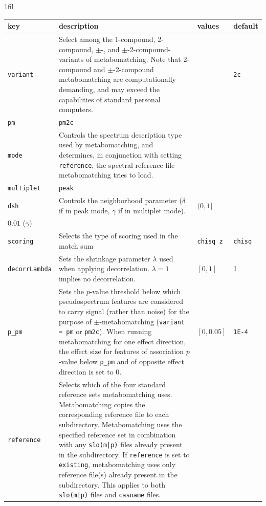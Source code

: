 \documentclass[a4paper,11pt]{article}
\makeatletter
\newcommand*{\centerfloat}{%
  \parindent \z@
  \leftskip \z@ \@plus 1fil \@minus \textwidth
  \rightskip\leftskip
  \parfillskip \z@skip}
\makeatother
\begin{document}
\begin{table}[h]
\small
\centerfloat
\begin{tabularx}{1.2\linewidth}{@{}lXll@{}}
key & description & values & default \\
\midrule
\texttt{variant} & %
Select among the 1-compound, 2-compound, $\pm$-, and $\pm$-2-compound-variants of metabomatching. Note that 2-compound and $\pm$-2-compound metabomatching are computationally demanding, and may exceed the capabilities of standard personal computers.& %
\begin{tabular}[t]{@{}ll@{}}\texttt{1c}&\texttt{2c}\\\texttt{pm}&\texttt{pm2c}\end{tabular}\\
\texttt{mode} & Controls the spectrum description type used by metabomatching, and determines, in conjunction with setting \texttt{reference}, the spectral reference file metabomatching tries to load. & %
\begin{tabular}[t]{@{}l@{}}\texttt{peak}\\\texttt{multiplet}\end{tabular} & %
\texttt{peak} \\
\texttt{dsh} & %
Controls the neighborhood parameter ($\delta$ if in peak mode, $\gamma$ if in multiplet mode). & %
$(0,1]$ & %
\begin{tabular}[t]{@{}l@{}}$0.025$ ($\delta$)\\ $0.01$ ($\gamma$)\end{tabular}\\
\texttt{scoring} & Selects the type of scoring used in the match sum & \texttt{chisq z} & \texttt{chisq} \\
\texttt{decorrLambda} & Sets the shrinkage parameter $\lambda$ used when applying decorrelation. $\lambda=1$ implies no decorrelation. & $[0,1]$ & 1\\
\texttt{p\_pm} & Sets the $p$-value threshold below which pseudospectrum features are considered to carry signal (rather than noise) for the purpose of $\pm$-metabomatching (\texttt{variant = pm} or \texttt{pm2c}). When running metabomatching for one effect direction, the effect size for features of association $p$-value below \texttt{p\_pm} and of opposite effect direction is set to 0. & $[0,0.05]$ & \texttt{1E-4}\\
\texttt{reference} & %
Selects which of the four standard reference sets metabomatching uses. Metabomatching copies the corresponding reference file to each subdirectory. Metabomatching uses the specified reference set in combination with any \verb+slo(m|p)+ files already present in the subdirectory. If \verb|reference| is set to \verb|existing|, metabomatching uses only reference file(s) already present in the subdirectory. This applies to both \verb+slo(m|p)+ files and \verb|casname| files. & %

\end{tabularx}
\end{table}
\end{document}
